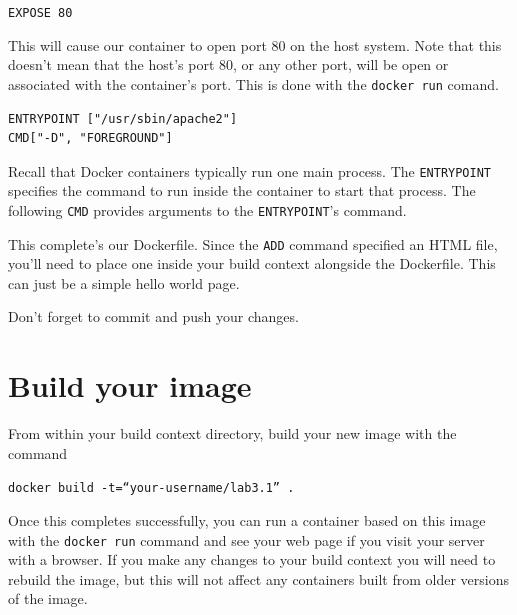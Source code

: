 \documentclass{article}
\begin{document}
\texttt{EXPOSE 80}

This will cause our container to open port 80 on the host system.  Note that this doesn't mean that the host's port 80, or any other port, will be open or associated with the container's port.  This is done with the \texttt{docker run} comand.

\begin{verbatim}
ENTRYPOINT ["/usr/sbin/apache2"]
CMD["-D", "FOREGROUND"]
\end{verbatim}

Recall that Docker containers typically run one main process.  The \texttt{ENTRYPOINT} specifies the command to run inside the container to start that process. The following \texttt{CMD} provides arguments to the \texttt{ENTRYPOINT}'s command.

This complete's our Dockerfile.  Since the \texttt{ADD} command specified an HTML file, you'll need to place one inside your build context alongside the Dockerfile. This can just be a simple hello world page.

Don't forget to commit and push your changes.

\section{Build your image}
From within your build context directory, build your new image with the command

\texttt{docker build -t=``your-username/lab3.1'' .}

Once this completes successfully, you can run a container based on this image with the \texttt{docker run} command and see your web page if you visit your server with a browser. If you make any changes  to your build context you will need to rebuild the image, but this will not affect any containers built from older versions of the image.
\end{document}
